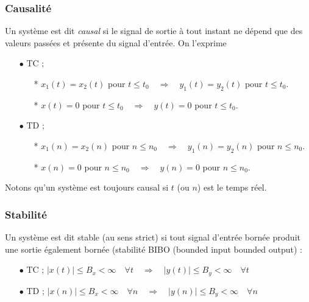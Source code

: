 		\subsubsection{Causalité}
		Un système est dit \textit{causal} si le signal de sortie à tout instant ne dépend que 
		des valeurs passées et présente du signal d'entrée. On l'exprime
		\begin{itemize}
		\item[$\bullet$ TC ;] \ 
		\begin{itemize}
		\item[*] $x_1(t) = x_2(t)$ pour $t\leq t_0 \quad \Rightarrow\quad y_1(t)=y_2(t)$ pour 
		$t\leq t_0$.
		\item[*] $x(t) = 0$ pour $t\leq t_0\quad \Rightarrow\quad y(t)=0$ pour $t\leq t_0$.
		\end{itemize}
		\item[$\bullet$ TD ;] \ 
		\begin{itemize}
		\item[*] $x_1(n) = x_2(n)$ pour $n\leq n_0 \quad \Rightarrow\quad y_1(n)=y_2(n)$ pour 
		$n\leq n_0$.
		\item[*] $x(n) = 0$ pour $n\leq n_0\quad \Rightarrow\quad y(n)=0$ pour $n\leq n_0$.
		\end{itemize}
		\end{itemize}	
		Notons qu'un système est toujours causal si $t$ (ou $n$) est le temps réel.
		
		\subsubsection{Stabilité}
		Un système est dit stable (au sens strict) si tout signal d'entrée bornée produit 
		une sortie également bornée (stabilité BIBO (bounded input bounded output) :
		\begin{itemize}
		\item[$\bullet$ TC ;] $|x(t)| \leq B_x <\infty\quad \forall t\quad \Rightarrow\quad 
		|y(t)| \leq B_y<\infty\quad \forall t$
		\item[$\bullet$ TD ;] $|x(n)| \leq B_x <\infty\quad \forall n\quad \Rightarrow\quad 
		|y(n)| \leq B_y<\infty\quad \forall n$
		\end{itemize}		
	
	
	
	
	
	
	
	
	
	
	
	
	
	
	
	
	
	
	
	
	
	
	
	
	
	
	
	